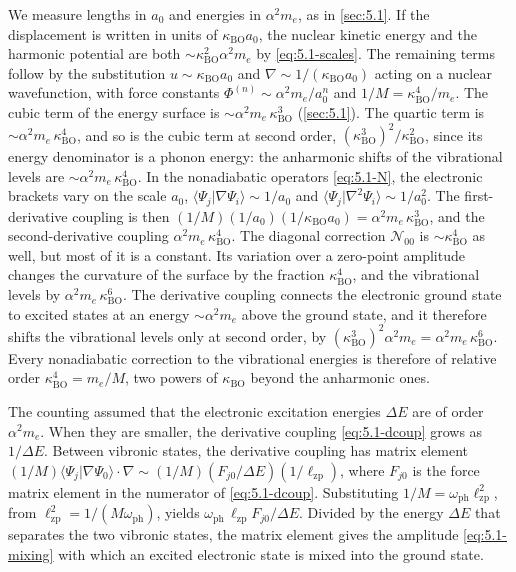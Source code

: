 We measure lengths in $a_0$ and energies in $\alpha^2m_e$, as in \cref{sec:5.1}. If the displacement is written in units of $\kappa_{\mathrm{BO}}a_0$, the nuclear kinetic energy and the harmonic potential are both $\sim\kappa_{\mathrm{BO}}^2\alpha^2m_e$ by \cref{eq:5.1-scales}. The remaining terms follow by the substitution $u \sim \kappa_{\mathrm{BO}}a_0$ and $\nabla \sim 1/(\kappa_{\mathrm{BO}}a_0)$ acting on a nuclear wavefunction, with force constants $\Phi^{(n)} \sim \alpha^2m_e/a_0^n$ and $1/M = \kappa_{\mathrm{BO}}^4/m_e$. The cubic term of the energy surface is $\sim\alpha^2m_e\,\kappa_{\mathrm{BO}}^3$ (\cref{sec:5.1}). The quartic term is $\sim\alpha^2m_e\,\kappa_{\mathrm{BO}}^4$, and so is the cubic term at second order, $(\kappa_{\mathrm{BO}}^3)^2/\kappa_{\mathrm{BO}}^2$, since its energy denominator is a phonon energy: the anharmonic shifts of the vibrational levels are $\sim\alpha^2m_e\,\kappa_{\mathrm{BO}}^4$. In the nonadiabatic operators \cref{eq:5.1-N}, the electronic brackets vary on the scale $a_0$, $\langle\Psi_j|\nabla\Psi_i\rangle \sim 1/a_0$ and $\langle\Psi_j|\nabla^2\Psi_i\rangle \sim 1/a_0^2$. The first-derivative coupling is then $(1/M)(1/a_0)(1/\kappa_{\mathrm{BO}}a_0) = \alpha^2m_e\,\kappa_{\mathrm{BO}}^3$, and the second-derivative coupling $\alpha^2m_e\,\kappa_{\mathrm{BO}}^4$. The diagonal correction $\mathcal{N}_{00}$ is $\sim\kappa_{\mathrm{BO}}^4$ as well, but most of it is a constant. Its variation over a zero-point amplitude changes the curvature of the surface by the fraction $\kappa_{\mathrm{BO}}^4$, and the vibrational levels by $\alpha^2m_e\,\kappa_{\mathrm{BO}}^6$. The derivative coupling connects the electronic ground state to excited states at an energy $\sim\alpha^2m_e$ above the ground state, and it therefore shifts the vibrational levels only at second order, by $(\kappa_{\mathrm{BO}}^3)^2\alpha^2m_e = \alpha^2m_e\,\kappa_{\mathrm{BO}}^6$. Every nonadiabatic correction to the vibrational energies is therefore of relative order $\kappa_{\mathrm{BO}}^4 = m_e/M$, two powers of $\kappa_{\mathrm{BO}}$ beyond the anharmonic ones.

The counting assumed that the electronic excitation energies $\Delta E$ are of order $\alpha^2m_e$. When they are smaller, the derivative coupling \cref{eq:5.1-dcoup} grows as $1/\Delta E$. Between vibronic states, the derivative coupling has matrix element $(1/M)\langle\Psi_j|\nabla\Psi_0\rangle\cdot\nabla \sim (1/M)(F_{j0}/\Delta E)(1/\ell_{\mathrm{zp}})$, where $F_{j0}$ is the force matrix element in the numerator of \cref{eq:5.1-dcoup}. Substituting $1/M = \omega_{\mathrm{ph}}\ell_{\mathrm{zp}}^2$, from $\ell_{\mathrm{zp}}^2 = 1/(M\omega_{\mathrm{ph}})$, yields $\omega_{\mathrm{ph}}\,\ell_{\mathrm{zp}}F_{j0}/\Delta E$. Divided by the energy $\Delta E$ that separates the two vibronic states, the matrix element gives the amplitude \cref{eq:5.1-mixing} with which an excited electronic state is mixed into the ground state.

